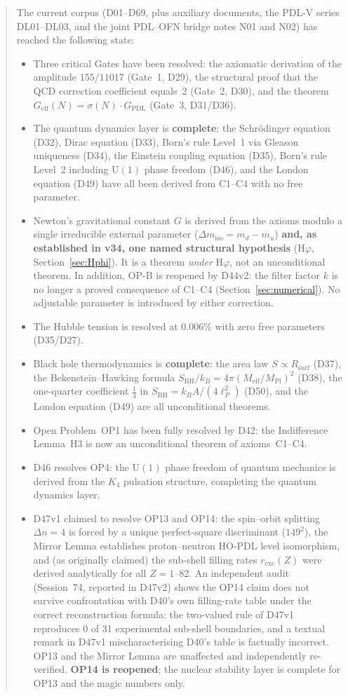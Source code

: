 \documentclass[11pt,a4paper]{article}
\theoremstyle{plain}
\theoremstyle{definition}
\theoremstyle{remark}
\newcommand{\Kfour}{K_4}
\newcommand{\Geff}{G_{\mathrm{eff}}}
\newcommand{\GPDL}{G_{\mathrm{PDL}}}
\newcommand{\Rsurf}{R_{\mathrm{surf}}}
\newcommand{\sigmaN}{\sigma(N)}
\newcommand{\SBH}{S_{\mathrm{BH}}}
\newcommand{\Meff}{M_{\mathrm{eff}}}
\newcommand{\MPl}{M_{\mathrm{Pl}}}
\begin{document}
\begin{abstract}
The current corpus (D01--D69, plus auxiliary documents, the PDL-V series DL01--DL03, and the joint PDL--OFN bridge notes N01 and N02) has reached the following state:
\begin{itemize}
\item Three critical Gates have been resolved: the axiomatic derivation of the amplitude $155/11017$ (Gate~1, D29), the structural proof that the QCD correction coefficient equals~2 (Gate~2, D30), and the theorem $\Geff(N)=\sigmaN\cdot\GPDL$ (Gate~3, D31/D36).
\item The quantum dynamics layer is \textbf{complete}: the Schr\"odinger equation (D32), Dirac equation (D33), Born's rule Level~1 via Gleason uniqueness (D34), the Einstein coupling equation (D35), Born's rule Level~2 including $\mathrm{U}(1)$ phase freedom (D46), and the London equation (D49) have all been derived from C1--C4 with no free parameter.
\item Newton's gravitational constant $G$ is derived from the axioms modulo a single irreducible external parameter ($\Delta m_{\mathrm{iso}} = m_d - m_u$) \textbf{and, as established in v34, one named structural hypothesis} (H$\varphi$, Section~\ref{sec:Hphi}). It is a theorem \emph{under} H$\varphi$, not an unconditional theorem. \textcolor{negativered}{In addition, OP-B is reopened by D44v2: the filter factor $k$ is no longer a proved consequence of C1--C4 (Section~\ref{sec:numerical}).} No adjustable parameter is introduced by either correction.
\item The Hubble tension is resolved at $0.006\%$ with zero free parameters (D35/D27).
\item Black hole thermodynamics is \textbf{complete}: the area law $S \propto \Rsurf$ (D37), the Bekenstein--Hawking formula $\SBH/k_B = 4\pi(\Meff/\MPl)^2$ (D38), the one-quarter coefficient $\tfrac{1}{4}$ in $\SBH = k_B A/(4\ell_P^2)$ (D50), and the London equation (D49) are all unconditional theorems.
\item Open Problem~OP1 has been fully resolved by D42: the Indifference Lemma~H3 is now an unconditional theorem of axioms~C1--C4.
\item D46 resolves OP4: the $\mathrm{U}(1)$ phase freedom of quantum mechanics is derived from the $\Kfour$ pulsation structure, completing the quantum dynamics layer.
\item D47v1 claimed to resolve OP13 and OP14: the spin--orbit splitting $\Delta n = 4$ is forced by a unique perfect-square discriminant ($149^2$), the Mirror Lemma establishes proton--neutron HO-PDL level isomorphism, and (as originally claimed) the sub-shell filling rates $r_{\mathrm{exc}}(Z)$ were derived analytically for all $Z = 1$--82. \textcolor{negativered}{An independent audit (Session~74, reported in D47v2) shows the OP14 claim does not survive confrontation with D40's own filling-rate table under the correct reconstruction formula: the two-valued rule of D47v1 reproduces 0 of 31 experimental sub-shell boundaries, and a textual remark in D47v1 mischaracterising D40's table is factually incorrect.} OP13 and the Mirror Lemma are unaffected and independently re-verified. \textbf{OP14 is reopened}; the nuclear stability layer is complete for OP13 and the magic numbers only.

\end{itemize}
\end{abstract}
\end{document}
